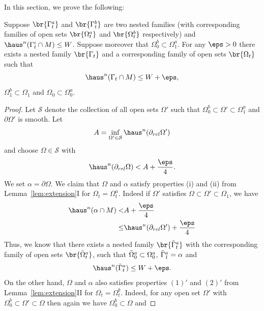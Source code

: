 In this section, we prove the following:
\begin{proposition}\label{prop:gluing-two-nested}
    Suppose $\br{\Gamma_t^a}$ and $\br{\Gamma_t^b}$ are two nested families (with corresponding families of open sets $\br{\Omega_t^a}$ and $\br{\Omega_t^b}$ respectively) and $\haus^n(\Gamma_t^i\cap M) \leq W$. Suppose moreover that $\Omega_0^b \subset \Omega_1^a$. For any $\eps > 0$ there exists a nested family $\br{\Gamma_t}$ and a corresponding family of open sets $\br{\Omega_t}$ such that
    \begin{equation*}
        \haus^n(\Gamma_t\cap M) \leq W + \eps,
    \end{equation*}
    $\Omega_1^b \subset \Omega_1$ and $\Omega_0 \subset \Omega_0^a$.
    \begin{proof}
        Let $\mathcal{S}$ denote the collection of all open sets $\Omega'$ such that $\Omega_0^b \subset \Omega' \subset \Omega_1^a$ and $\partial\Omega'$ is smooth. Let 
        \begin{equation*}
            A = \inf_{\Omega'\in\mathcal{S}}\haus^n(\partial_{rel}\Omega')
        \end{equation*}
        and choose $\Omega\in \mathcal{S}$ with
        \begin{equation*}
            \haus^n(\partial_{rel}\Omega) < A + \frac{\eps}{4}.
        \end{equation*}
        We set $\alpha = \partial\Omega$. We claim that $\Omega$ and $\alpha$ satisfy properties (i) and (ii) from Lemma~\ref{lem:extension}I for $\Omega_t = \Omega_t^a$. Indeed if $\Omega'$ satisfies $\Omega \subset \Omega' \subset \Omega_1$, we have
        \begin{equation*}
        \begin{split}
            \haus^n(\alpha\cap M) <& A + \frac{\eps}{4}\\
            \leq& \haus^n(\partial_{rel}\Omega') + \frac{\eps}{4}
        \end{split}
        \end{equation*}
        Thus, we know that there exists a nested family $\br{\Tilde{\Gamma}_t^a}$ with the corresponding family of open sets $\br{\Tilde{\Omega}_t^a}$, such that $\Tilde{\Omega}_0^a \subset \Omega_0^a$, $\Tilde{\Gamma}_1^a = \alpha$ and
        \begin{equation*}
            \haus^n(\Tilde{\Gamma}_t^a) \leq W + \eps.
        \end{equation*}
        On the other hand, $\Omega$ and $\alpha$ also satisfies properties $(1)'$ and $(2)'$ from Lemma~\ref{lem:extension}II for $\Omega_t = \Omega_t^b$. Indeed, for any open set $\Omega'$ with $\Omega_0^b \subset \Omega' \subset \Omega$ then again we have $\Omega_0^b \subset \Omega$ and 

\end{proof}
\end{proposition}
